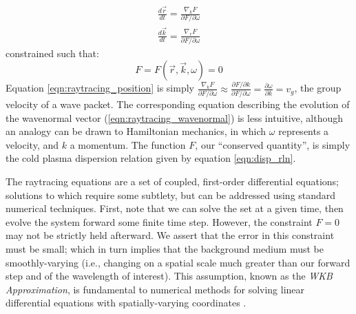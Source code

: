 \begin{eqnarray}
\frac{d\vec{r}}{dt} = \frac{\nabla_kF}{\partial F/\partial \omega} \label{eqn:raytracing_position}\\
\frac{d\vec{k}}{dt} = \frac{\nabla_rF}{\partial F/\partial \omega} \label{eqn:raytracing_wavenormal}
\end{eqnarray}
constrained such that:
\begin{equation}
F = F(\vec{r},\vec{k},\omega) = 0
\end{equation}
Equation \eqref{eqn:raytracing_position} is simply $\frac{\nabla_kF}{\partial F/\partial \omega} \approx\frac{\partial F/\partial k}{\partial F /\partial \omega} = \frac{\partial \omega}{\partial k} = v_g$, the group velocity of a wave packet. The corresponding equation describing the evolution of the wavenormal vector (\ref{eqn:raytracing_wavenormal}) is less intuitive, although an analogy can be drawn to Hamiltonian mechanics, in which $\omega$ represents a velocity, and $k$ a momentum. The function $F$, our ``conserved quantity'', is simply the cold plasma dispersion relation given by equation \eqref{eqn:disp_rln}.

The raytracing equations are a set of coupled, first-order differential equations; solutions to which require some subtlety, but can be addressed using standard numerical techniques. First, note that we can solve the set at a given time, then evolve the system forward some finite time step. However, the constraint $F=0$ may not be strictly held afterward. We assert that the error in this constraint must be small; which in turn implies that the background medium must be smoothly-varying (i.e., changing on a spatial scale much greater than our forward step and of the wavelength of interest). This assumption, known as the \emph{WKB Approximation}, is fundamental to numerical methods for solving linear differential equations with spatially-varying coordinates \citep{Bender1999}.

